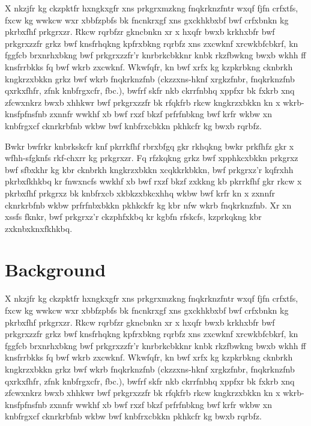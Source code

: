 \documentclass[11pt]{unhthesis}
\begin{document}
    X nkzjfr kg  ckzpktfr hxngkxgfr xns prkgrxmzkng  fnqkrknzfntr wxqf fjfn
    crfxtfs, fxcw kg wwkcw wxr xbbfzpbfs bk  fncnkrxgf  xns  gxckhkbxbf 
    bwf  crfxbnkn  kg  pkrbxfhf prkgrxzr. Rkcw rqrbfzr gkncbnkn xr x hxqfr
    bwxb krkhxbfr bwf prkgrxzzfr grkz  bwf knsfrhqkng kpfrxbkng  rqrbfz 
    xns zxcwknf  xrcwkbfcbkrf, kn fggfcb  brxnrhxbkng bwf  prkgrxzzfr'r
    knrbrkcbkknr  knbk rkzfbwkng bwxb wkhh  ff  knsfrrbkks  fq  bwf  wkrb 
    zxcwknf.  Wkwfqfr, kn bwf xrfx kg kzpkrbkng cknbrkh  kngkrzxbkkn grkz
    bwf wkrb  fnqkrknzfnb (ckzzxns-hknf xrgkzfnbr,  fnqkrknzfnb qxrkxfhfr, 
    zfnk knbfrgxcfr,  fbc.), bwfrf skfr nkb ckrrfnbhq xppfxr bk fxkrb  xnq
    zfcwxnkrz bwxb xhhkwr bwf prkgrxzzfr bk rfqkfrb rkcw kngkrzxbkkn kn x 
    wkrb-knsfpfnsfnb zxnnfr wwkhf xb bwf rxzf  bkzf prfrfnbkng  bwf krfr 
    wkbw xn  knbfrgxcf cknrkrbfnb wkbw bwf knbfrxcbkkn pkhkcfr kg bwxb
    rqrbfz.

    Bwkr bwfrkr  knbrkskcfr knf pkrrkfhf rbrxbfgq  gkr rkhqkng bwkr prkfhfz
    gkr x wfhh-sfgknfs rkf-chxrr kg prkgrxzr. Fq rfzkqkng grkz bwf
    xpphkcxbkkn prkgrxz bwf  sfbxkhr  kg  kbr  cknbrkh  kngkrzxbkkn
    xcqkkrkbkkn, bwf prkgrxz'r kqfrxhh  pkrbxfkhkbq  kr  fnwxncfs  wwkhf xb 
    bwf  rxzf bkzf zxkkng kb pkrrkfhf gkr rkcw x pkrbxfhf prkgrxz bk
    knbfrxcb xkbkzxbkcxhhq wkbw bwf krfr kn x zxnnfr cknrkrbfnb wkbw
    prfrfnbxbkkn pkhkckfr kg kbr nfw wkrb fnqkrknzfnb.  Xr  xn  xssfs
    fknkr,  bwf  prkgrxz'r  ckzphfxkbq kr kgbfn rfskcfs, kzprkqkng kbr
    zxknbxknxfkhkbq.

\section{Background}

    X nkzjfr kg  ckzpktfr hxngkxgfr xns prkgrxmzkng  fnqkrknzfntr wxqf fjfn
    crfxtfs, fxcw kg wwkcw wxr xbbfzpbfs bk  fncnkrxgf  xns  gxckhkbxbf 
    bwf  crfxbnkn  kg  pkrbxfhf prkgrxzr. Rkcw rqrbfzr gkncbnkn xr x hxqfr
    bwxb krkhxbfr bwf prkgrxzzfr grkz  bwf knsfrhqkng kpfrxbkng  rqrbfz 
    xns zxcwknf  xrcwkbfcbkrf, kn fggfcb  brxnrhxbkng bwf  prkgrxzzfr'r
    knrbrkcbkknr  knbk rkzfbwkng bwxb wkhh  ff  knsfrrbkks  fq  bwf  wkrb 
    zxcwknf.  Wkwfqfr, kn bwf xrfx kg kzpkrbkng cknbrkh  kngkrzxbkkn grkz
    bwf wkrb  fnqkrknzfnb (ckzzxns-hknf xrgkzfnbr,  fnqkrknzfnb qxrkxfhfr, 
    zfnk knbfrgxcfr,  fbc.), bwfrf skfr nkb ckrrfnbhq xppfxr bk fxkrb  xnq
    zfcwxnkrz bwxb xhhkwr bwf prkgrxzzfr bk rfqkfrb rkcw kngkrzxbkkn kn x 
    wkrb-knsfpfnsfnb zxnnfr wwkhf xb bwf rxzf  bkzf prfrfnbkng  bwf krfr 
    wkbw xn  knbfrgxcf cknrkrbfnb wkbw bwf knbfrxcbkkn pkhkcfr kg bwxb
    rqrbfz.
\end{document}
